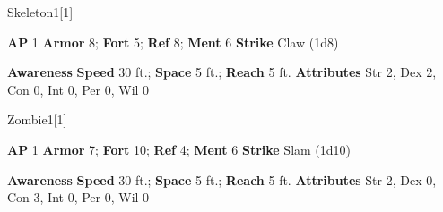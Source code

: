 \begin{monsection}{Skeleton}{1}[1]
\vspace{-1em}\vspace{-1em}
\begin{spellcontent}
\begin{spelltargetinginfo}
{\textbf{AP} 1}
\pari \textbf{Armor} 8;
\textbf{Fort} 5;
\textbf{Ref} 8;
\textbf{Ment} 6
\pari \textbf{Strike} Claw  (1d8)
\end{spelltargetinginfo}
\end{spellcontent}
\begin{spellsubcontent}
\begin{spellfooter}
\pari \textbf{Awareness} 
\pari \textbf{Speed} 30 ft.;
\textbf{Space} 5 ft.;
\textbf{Reach} 5 ft.
\pari \textbf{Attributes}
Str 2,
Dex 2,
Con 0,
Int 0,
Per 0,
Wil 0
\end{spellfooter}
\end{spellsubcontent}
\end{monsection}
\begin{monsection}{Zombie}{1}[1]
\vspace{-1em}\vspace{-1em}
\begin{spellcontent}
\begin{spelltargetinginfo}
{\textbf{AP} 1}
\pari \textbf{Armor} 7;
\textbf{Fort} 10;
\textbf{Ref} 4;
\textbf{Ment} 6
\pari \textbf{Strike} Slam  (1d10)
\end{spelltargetinginfo}
\end{spellcontent}
\begin{spellsubcontent}
\begin{spellfooter}
\pari \textbf{Awareness} 
\pari \textbf{Speed} 30 ft.;
\textbf{Space} 5 ft.;
\textbf{Reach} 5 ft.
\pari \textbf{Attributes}
Str 2,
Dex 0,
Con 3,
Int 0,
Per 0,
Wil 0
\end{spellfooter}
\end{spellsubcontent}
\end{monsection}